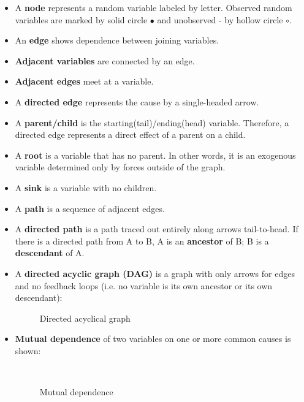 \begin{itemize}

\item A \textbf{node} represents a random variable labeled by letter. Observed random variables are marked by solid circle $\bullet$ and unobserved - by hollow circle \( \circ \).

\item An \textbf{edge} shows dependence between joining variables.

\item \textbf{Adjacent variables} are connected by an edge.

\item \textbf{Adjacent edges} meet at a variable.

\item A \textbf{directed edge} represents the cause by a single-headed arrow.

\item A \textbf{parent/child} is the starting(tail)/ending(head) variable. Therefore, a directed edge represents a direct effect of a parent on a child.

\item A \textbf{root} is a variable that has no parent. In other words, it is an exogenous variable determined only by forces outside of the graph.

\item A \textbf{sink} is a variable with no children.

\item A \textbf{path} is a sequence of adjacent edges.

\item A \textbf{directed path} is a path traced out entirely along arrows tail-to-head. If there is a directed path from A to B,  A is an \textbf{ancestor} of B; B is a  \textbf{descendant} of A.

\item A \textbf{directed acyclic graph (DAG)} is a graph with only arrows for edges and no feedback loops (i.e. no variable is its own ancestor or its own descendant):

\begin{figure}[htp]\centering
\caption{Directed acyclical graph}
\end{figure}

\item \textbf{Mutual dependence} of two variables on one or more common causes is shown:

\begin{figure}[htp]\centering
\caption{Mutual dependence}\
\end{figure}

\end{itemize}

